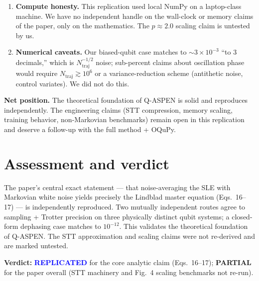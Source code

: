 \documentclass[11pt]{article}
\begin{document}
\begin{enumerate}
\item \textbf{Compute honesty.}  This replication used local NumPy on a
laptop-class machine.  We have no independent handle on the wall-clock or
memory claims of the paper, only on the mathematics.  The $p\!\approx\!2.0$
scaling claim is untested by us.

\item \textbf{Numerical caveats.}  Our biased-qubit case matches to
$\sim\!3\times 10^{-3}$ ``to 3 decimals,'' which is $N_{\mathrm{traj}}^{-1/2}$
noise; sub-percent claims about oscillation phase would require
$N_{\mathrm{traj}}\gtrsim 10^{6}$ or a variance-reduction scheme (antithetic
noise, control variates).  We did not do this.
\end{enumerate}

\textbf{Net position.}  The theoretical foundation of Q-ASPEN is solid and
reproduces independently.  The engineering claims (STT compression, memory
scaling, training behavior, non-Markovian benchmarks) remain open in this
replication and deserve a follow-up with the full method + OQuPy.

\section{Assessment and verdict}

The paper's central exact statement --- that noise-averaging the SLE with
Markovian white noise yields precisely the Lindblad master equation
(Eqs.~16--17) --- is independently reproduced.  Two mutually independent
routes agree to sampling + Trotter precision on three physically distinct
qubit systems; a closed-form dephasing case matches to $10^{-12}$.  This
validates the theoretical foundation of Q-ASPEN.  The STT approximation and
scaling claims were not re-derived and are marked untested.

\medskip
\noindent\textbf{Verdict:} \textcolor{blue}{\textbf{REPLICATED}} for the core
analytic claim (Eqs.~16--17);
\textbf{PARTIAL} for the paper overall (STT machinery and Fig.~4 scaling
benchmarks not re-run).
\end{document}
